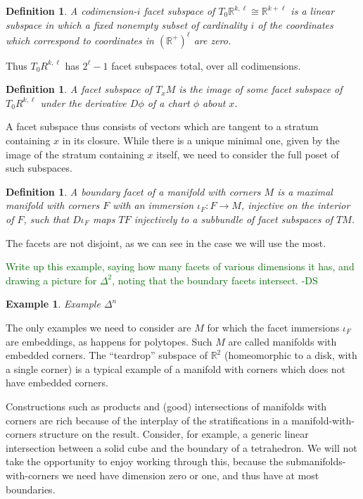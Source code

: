 \documentclass{amsart}          %
\newtheorem{definition}[theorem]{Definition}
\newtheorem{example}[theorem]{Example}
\newcommand{\forclass}[1]{\textcolor{darkgreen}{#1 -DS}}
\newcommand{\R}{\mathbb R}
\begin{document}
\begin{definition}
A codimension-$i$ facet subspace of $T_0 \R^{k,\ell} \cong \R^{k+\ell}$ is a linear subspace in which a fixed nonempty 
subset of cardinality $i$ of the 
coordinates which correspond to coordinates in $(\R^+)^\ell$  are zero.
\end{definition}

Thus $T_0 R^{k,\ell}$ has $2^\ell - 1$ facet subspaces total, over all codimensions.

\begin{definition}
A facet subspace of $T_x M$ is the image of some facet subspace of $T_0 R^{k,\ell}$ under the derivative $D \phi$ of a chart $\phi$ about $x$.
\end{definition}

A facet subspace thus consists of vectors which are tangent to a stratum containing $x$ in its closure.  
While there is a unique minimal one, given by the image of the stratum containing $x$ itself, we need to consider the full poset of such
subspaces.
 

\begin{definition}
A boundary facet of a manifold with corners $M$ is a maximal manifold with corners $F$ with an immersion 
$\iota_F : F \to M$, injective on the interior of $F$, such that $D\iota_F$ maps $TF$ injectively to a subbundle of facet 
subspaces of $TM$.  
\end{definition}

The facets are not disjoint, as we can see in the case we will use the most.

\forclass{Write up this example, saying how many facets of various dimensions it has, and drawing a picture for $\Delta^2$, noting that the 
boundary facets intersect.}

\begin{example}
Example $\Delta^n$
\end{example}

The only examples we need to consider are $M$ for which the facet immersions $\iota_F$ are embeddings, as happens for polytopes.
Such $M$ are called manifolds with embedded corners.  
The ``teardrop'' subspace of $\R^2$ (homeomorphic to a disk, with a single corner) is  a typical example of a manifold with corners
which does not have embedded corners.

Constructions such as products and (good) intersections of manifolds with corners are rich because of the interplay of the stratifications in 
a manifold-with-corners structure on the result.  Consider, for example, a generic linear intersection between a solid cube and the 
boundary of a tetrahedron.
We will not take the opportunity to enjoy working through this, because the submanifolds-with-corners we need have dimension
zero or one, and thus have at most boundaries.
\end{document}
